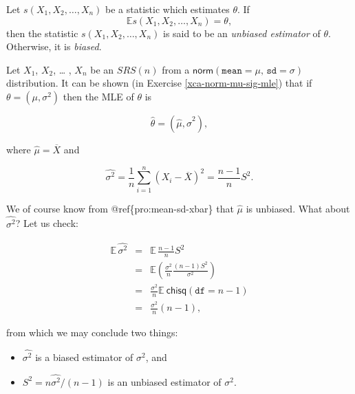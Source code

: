 \documentclass[]{book}
\providecommand{\tightlist}{%
  \setlength{\itemsep}{0pt}\setlength{\parskip}{0pt}}
\numberwithin{equation}{chapter}
\numberwithin{figure}{chapter}
\theoremstyle{plain}
\theoremstyle{definition}
\theoremstyle{remark}
\theoremstyle{definition}
\theoremstyle{definition}
\theoremstyle{remark}
\let\BeginKnitrBlock\begin \let\EndKnitrBlock\end
\begin{document}
\BeginKnitrBlock{definition}
\protect\hypertarget{def:unnamed-chunk-343}{}{\label{def:unnamed-chunk-343}}Let
\(s(X_{1},X_{2},\ldots,X_{n})\) be a statistic which estimates
\(\theta\). If \[ \mathbb{E} s(X_{1},X_{2},\ldots,X_{n})=\theta, \] then
the statistic \(s(X_{1},X_{2},\ldots,X_{n})\) is said to be an
\emph{unbiased estimator} of \(\theta\). Otherwise, it is \emph{biased}.
\EndKnitrBlock{definition}

\bigskip

\BeginKnitrBlock{example}
\protect\hypertarget{ex:normal-mle-both}{}{\label{ex:normal-mle-both}}Let
\(X_{1}\), \(X_{2}\), \ldots{} , \(X_{n}\) be an \(SRS(n)\) from a
\(\mathsf{norm}(\mathtt{mean}=\mu,\,\mathtt{sd}=\sigma)\) distribution.
It can be shown (in Exercise \ref{xca-norm-mu-sig-mle}) that if
\(\mbox{$\theta$}=(\mu,\sigma^{2})\) then the MLE of \(\theta\) is

\begin{equation}
\hat{\theta}=(\hat{\mu},\hat{\sigma}^{2}),
\end{equation}

where \(\hat{\mu}=\overline{X}\) and

\begin{equation}
\hat{\sigma^{2}}=\frac{1}{n}\sum_{i=1}^{n}\left(X_{i}-\overline{X}\right)^{2}=\frac{n-1}{n}S^{2}.
\end{equation}
\EndKnitrBlock{example}

We of course know from @ref\{pro:mean-sd-xbar\} that \(\hat{\mu}\) is
unbiased. What about \(\hat{\sigma^{2}}\)? Let us check:

\begin{eqnarray*}
\mathbb{E}\,\hat{\sigma^{2}} & = & \mathbb{E}\,\frac{n-1}{n}S^{2}\\
 & = & \mathbb{E}\left(\frac{\sigma^{2}}{n}\frac{(n-1)S^{2}}{\sigma^{2}}\right)\\
 & = & \frac{\sigma^{2}}{n}\mathbb{E}\ \mathsf{chisq}(\mathtt{df}=n-1)\\
 & = & \frac{\sigma^{2}}{n}(n-1),
\end{eqnarray*}

from which we may conclude two things:

\begin{itemize}
\tightlist
\item
  \(\hat{\sigma^{2}}\) is a biased estimator of \(\sigma^{2}\), and
\item
  \(S^{2}=n\hat{\sigma^{2}}/(n-1)\) is an unbiased estimator of
  \(\sigma^{2}\).
\end{itemize}
\end{document}
